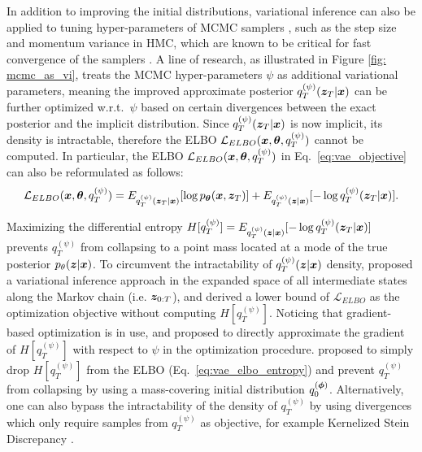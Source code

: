 In addition to improving the initial distributions, variational inference can also be applied to tuning hyper-parameters of MCMC samplers \citep{salimans2015markov,caterini2018hamiltonian,gong2019meta,campbell2021gradient}, such as the step size and momentum variance in HMC, which are known to be critical for fast convergence of the samplers \citep{neal2010mcmc}. A line of research, as illustrated in Figure \ref{fig: mcmc_as_vi}, treats the MCMC hyper-parameters $\psi$ as additional variational parameters, meaning the improved approximate posterior $q_T^{(\psi)}(\bm{z}_T|\bm{x})$ can be further optimized w.r.t.~$\psi$ based on certain divergences between the exact posterior and the implicit distribution.
%
Since $q_T^{(\psi)}(\bm{z}_T|\bm{x})$ is now implicit, its density is intractable, therefore the ELBO $\mathcal{L}_{ELBO}(\bm{x}, \bm{\theta}, q_T^{(\psi)})$ cannot be computed. In particular, the ELBO $\mathcal{L}_{ELBO}(\bm{x}, \bm{\theta}, q_T^{(\psi)})$ in Eq.~\eqref{eq:vae_objective} can also be reformulated as follows:
\begin{equation}
    \mathcal{L}_{ELBO}(\bm{x}, \bm{\theta}, q_T^{(\psi)}) = E_{q_T^{(\psi)}(\bm{z}_T|\bm{x})}[\log p_{\bm{\theta}}(\bm{x}, \bm{z}_T)] + E_{q_T^{(\psi)}(\bm{z}|\bm{x})}[-\log q_T^{(\psi)}(\bm{z}_T|\bm{x})].
\label{eq:vae_elbo_entropy}
\end{equation}

Maximizing the differential entropy $H[q_T^{(\psi)}]= E_{q_T^{(\psi)}(\bm{z}|\bm{x})}[- \log q_T^{(\psi)}(\bm{z}_T|\bm{x})]$ prevents $q_T^{(\psi)}$ from collapsing to a point mass located at a mode of the true posterior $p_{\theta}(\bm{z}|\bm{x})$. To circumvent the intractability of $q_T^{(\psi)}(\bm{z}|\bm{x})$ density, \citet{salimans2015markov} proposed a variational inference approach in the expanded space of all intermediate states along the Markov chain (i.e. $\bm{z}_{0:T}$), and derived a lower bound of $\mathcal{L}_{ELBO}$ as the optimization objective without computing $H[q_T^{(\psi)}]$. 
Noticing that gradient-based optimization is in use, \citet{li2018gradient} and \citet{gong2019meta} proposed to directly approximate the gradient of $H[q_T^{(\psi)}]$ with respect to $\psi$ in the optimization procedure.
\citet{campbell2021gradient} proposed to simply drop $H[q_T^{(\psi)}]$ from the ELBO (Eq.~\eqref{eq:vae_elbo_entropy}) and prevent $q_T^{(\psi)}$ from collapsing by using a mass-covering initial distribution $q_0^{(\bm{\phi})}$. 
%
Alternatively, one can also bypass the intractability of the density of $q_T^{(\psi)}$ by using divergences which only require samples from $q_T^{(\psi)}$ as objective, for example Kernelized Stein Discrepancy \citep{Liu2016kernel,chwialkowski2016kernel}. 

